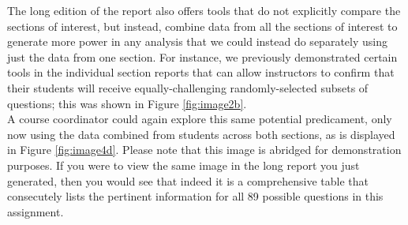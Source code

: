 \documentclass{article}\usepackage[]{graphicx}\usepackage[]{color}
\numberwithin{equation}{section} %
\begin{document}
\begin{center}
\captionsetup{width=0.55\textwidth}
\label{fig:image4c}
\end{center}

The long edition of the report also offers tools that do not explicitly compare the sections of interest, but instead, combine data from all the sections of interest to generate more power in any analysis that we could instead do separately using just the data from one section. For instance, we previously demonstrated certain tools in the individual section reports that can allow instructors to confirm that their students will receive equally-challenging randomly-selected subsets of questions; this was shown in Figure \ref{fig:image2b}.\\

A course coordinator could again explore this same potential predicament, only now using the data combined from students across both sections, as is displayed in Figure \ref{fig:image4d}. Please note that this image is abridged for demonstration purposes. If you were to view the same image in the long report you just generated, then you would see that indeed it is a comprehensive table that consecutely lists the pertinent information for all 89 possible questions in this assignment.
\end{document}
